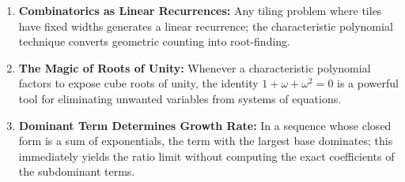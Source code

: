 \begin{takeaways}
\begin{enumerate}
    \item \textbf{Combinatorics as Linear Recurrences:} Any tiling problem where tiles have fixed widths generates a linear recurrence; the characteristic polynomial technique converts geometric counting into root-finding.
    \item \textbf{The Magic of Roots of Unity:} Whenever a characteristic polynomial factors to expose cube roots of unity, the identity $1 + \omega + \omega^2 = 0$ is a powerful tool for eliminating unwanted variables from systems of equations.
    \item \textbf{Dominant Term Determines Growth Rate:} In a sequence whose closed form is a sum of exponentials, the term with the largest base dominates; this immediately yields the ratio limit without computing the exact coefficients of the subdominant terms.
\end{enumerate}
\end{takeaways}
